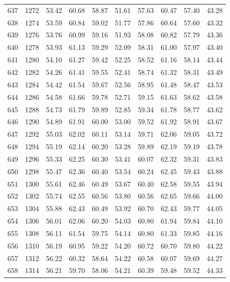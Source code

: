 \begin{longtable}{rrllllllll}
		637 & 1272 & 53.42 & 60.68 & 58.87 & 51.61 & 57.63 & 60.47 & 57.40 & 43.28 \\ 
		638 & 1274 & 53.59 & 60.84 & 59.02 & 51.77 & 57.86 & 60.64 & 57.60 & 43.32 \\ 
		639 & 1276 & 53.76 & 60.99 & 59.16 & 51.93 & 58.08 & 60.82 & 57.79 & 43.36 \\ 
		640 & 1278 & 53.93 & 61.13 & 59.29 & 52.09 & 58.31 & 61.00 & 57.97 & 43.40 \\ 
		641 & 1280 & 54.10 & 61.27 & 59.42 & 52.25 & 58.52 & 61.16 & 58.14 & 43.44 \\ 
		642 & 1282 & 54.26 & 61.41 & 59.55 & 52.41 & 58.74 & 61.32 & 58.31 & 43.49 \\ 
		643 & 1284 & 54.42 & 61.54 & 59.67 & 52.56 & 58.95 & 61.48 & 58.47 & 43.53 \\ 
		644 & 1286 & 54.58 & 61.66 & 59.78 & 52.71 & 59.15 & 61.63 & 58.62 & 43.58 \\ 
		645 & 1288 & 54.73 & 61.79 & 59.89 & 52.85 & 59.34 & 61.78 & 58.77 & 43.62 \\ 
		646 & 1290 & 54.89 & 61.91 & 60.00 & 53.00 & 59.52 & 61.92 & 58.91 & 43.67 \\ 
		647 & 1292 & 55.03 & 62.02 & 60.11 & 53.14 & 59.71 & 62.06 & 59.05 & 43.72 \\ 
		648 & 1294 & 55.19 & 62.14 & 60.20 & 53.28 & 59.89 & 62.19 & 59.19 & 43.78 \\ 
		649 & 1296 & 55.33 & 62.25 & 60.30 & 53.41 & 60.07 & 62.32 & 59.31 & 43.83 \\ 
		650 & 1298 & 55.47 & 62.36 & 60.40 & 53.54 & 60.24 & 62.45 & 59.43 & 43.88 \\ 
		651 & 1300 & 55.61 & 62.46 & 60.49 & 53.67 & 60.40 & 62.58 & 59.55 & 43.94 \\ 
		652 & 1302 & 55.74 & 62.55 & 60.56 & 53.80 & 60.56 & 62.65 & 59.66 & 44.00 \\ 
		653 & 1304 & 55.88 & 62.43 & 60.49 & 53.92 & 60.70 & 62.43 & 59.77 & 44.05 \\ 
		654 & 1306 & 56.01 & 62.06 & 60.20 & 54.03 & 60.80 & 61.94 & 59.84 & 44.10 \\ 
		655 & 1308 & 56.11 & 61.54 & 59.75 & 54.14 & 60.80 & 61.33 & 59.85 & 44.16 \\ 
		656 & 1310 & 56.19 & 60.95 & 59.22 & 54.20 & 60.72 & 60.70 & 59.80 & 44.22 \\ 
		657 & 1312 & 56.22 & 60.32 & 58.64 & 54.22 & 60.58 & 60.07 & 59.69 & 44.27 \\ 
		658 & 1314 & 56.21 & 59.70 & 58.06 & 54.21 & 60.39 & 59.48 & 59.52 & 44.33 \\ 

\end{longtable}
